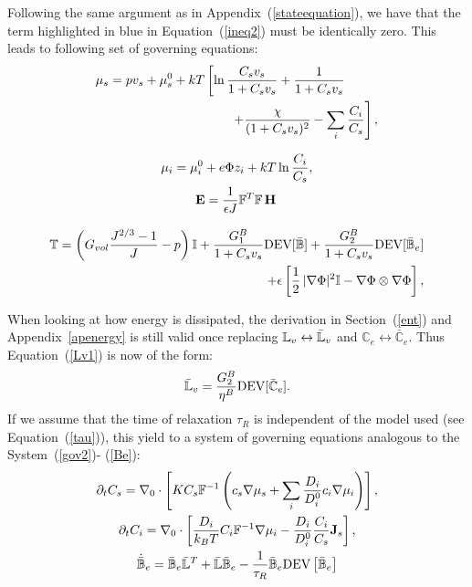 Following the same argument as in Appendix~(\ref{stateequation}), we have that the term highlighted in blue in Equation~(\ref{ineq2}) must be identically zero. This leads to following set of governing equations:
\begin{gather}
\begin{aligned}
\mu_s = p v_s + \mu_s^0 + kT&\left[\ln \frac{C_s v_s}{1+C_s v_s} + \frac{1}{1+C_sv_s}\right.\\
&\left.\ \ \ \ \ \ +\frac{\chi}{(1+C_s v_s)^2}-\sum_i \frac{C_i}{C_s}\right], 
\end{aligned}\\[2.5mm]
\mu_i = \mu^0_i + e\Phi z_i + kT \ln \frac{C_i}{C_s},\\
\mathbf{E} = \frac{1}{\epsilon J} \mathbb{F}^T \mathbb{F}\, \mathbf{H}\, \\[3mm]
\begin{aligned}
\mathbb{T}= \left(G_{vol}\dfrac{J^{2/3}-1}{J}-p\right) \mathbb{I} + \frac{G^B_1}{1+C_sv_s}\text{DEV}[\bar{\mathbb{B}}] + \frac{G^B_2}{1+C_sv_s}\text{DEV}[\bar{\mathbb{B}}_e]\\
+ \epsilon \left[\frac{1}{2} \,|\nabla \Phi|^2\mathbb{I} -\nabla \Phi \otimes \nabla \Phi\right],\label{sys2B}
\end{aligned}
\end{gather}

When looking at how energy is dissipated, the derivation in Section~(\ref{ent}) and Appendix~\ref{apenergy} is still valid once replacing $\mathbb{L}_v\leftrightarrow \bar{\mathbb{L}}_v$ and $\mathbb{C}_e\leftrightarrow\mathbb{\bar{C}}_e$. Thus Equation~(\ref{Lv1}) is now of the form:
\begin{equation}
\bar{\mathbb{L}}_v = \frac{G^B_2}{\eta^B} \text{DEV}[\bar{\mathbb{C}}_e].\label{Lv2}
\end{equation}
If we assume that the time of relaxation $\tau_R$ is independent of the model used (see Equation~(\ref{tau})), this yield to a system of governing equations analogous to the System~(\ref{gov2})- (\ref{Be}):
\begin{gather}
\partial_t C_s=\nabla_0 \cdot\left[K C_s \mathbb{F}^{-1}\left(c_s\nabla \mu_s +\sum_i \frac{D_i}{D^0_i} c_i \nabla \mu_i\right)\right],\\
\partial_t C_i= \nabla_0\cdot\left[\frac{D_i}{k_B T}C_i\mathbb{F}^{-1}\nabla \mu_i -\frac{D_i}{D^0_i} \frac{C_i}{C_s} \mathbf{J}_s\right],\\
\dot{\bar{\mathbb{B}}}_e = \bar{\mathbb{B}}_e \bar{\mathbb{L}}^T +\bar{\mathbb{L}} \bar{\mathbb{B}}_e -\frac{1}{\tau_R} \bar{\mathbb{B}}_e \text{DEV}\left[\bar{\mathbb{B}}_e\right]\label{BeB}
\end{gather}

